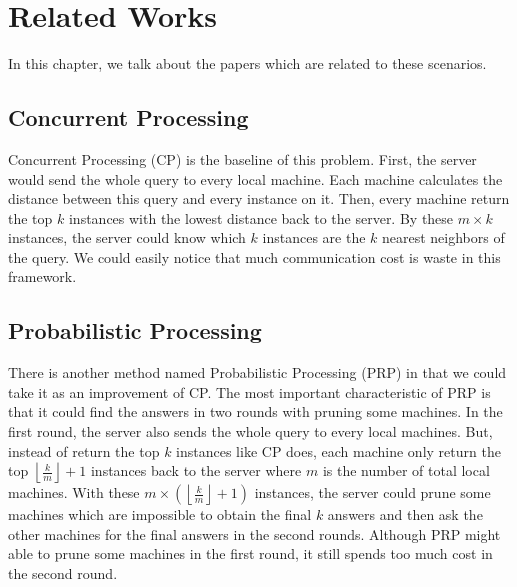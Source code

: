 \chapter{Related Works}
\label{c:related}

In this chapter, we talk about the papers which are related to these scenarios. \\

\section{Concurrent Processing} %
\label{s:concurrent_processing}
Concurrent Processing (CP) \cite{PRP} is the baseline of this problem.  First, the server would send the whole query to every local machine.  Each machine calculates the distance between this query and every instance on it.  Then, every machine return the top $k$ instances with the lowest distance back to the server.  By these $m\times k$ instances, the server could know which $k$ instances are the $k$ nearest neighbors of the query.  We could easily notice that much communication cost is waste in this framework.

\section{Probabilistic Processing} %
\label{s:probabilistic_processing}
\providecommand{\myfloor}[1]{\left \lfloor #1 \right \rfloor }
There is another method named Probabilistic Processing (PRP) in \cite{PRP} that we could take it as an improvement of CP. The most important characteristic of PRP is that it could find the answers in two rounds with pruning some machines.  In the first round, the server also sends the whole query to every local machines.  But, instead of return the top $k$ instances like CP does, each machine only return the top $\myfloor{\frac{k}{m}}+1$ instances back to the server where $m$ is the number of total local machines.  With these $m \times(\myfloor{\frac{k}{m}}+1)$ instances, the server could prune some machines which are impossible to obtain the final $k$ answers and then ask the other machines for the final answers in the second rounds.  Although PRP might able to prune some machines in the first round, it still spends too much cost in the second round.


